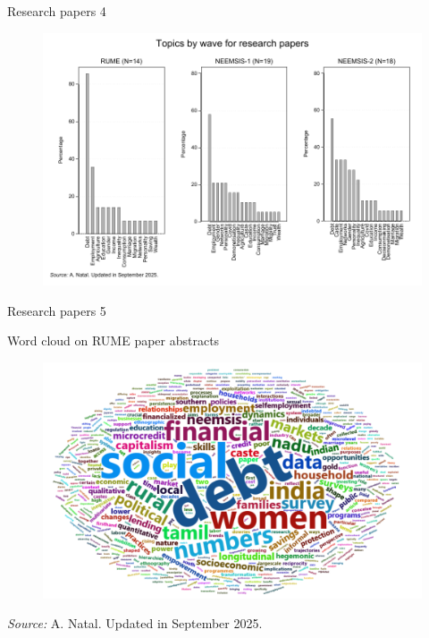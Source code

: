 \documentclass[aspectratio=169]{beamer}
\begin{document}
\begin{frame}{Research papers 4}

\begin{figure}[h]
\centering
\includegraphics[width=0.7\columnwidth]{INPUT/RP_topicswave}
\end{figure}

\end{frame}




\begin{frame}{Research papers 5}
\begin{footnotesize}

Word cloud on RUME paper abstracts
\begin{figure}[h]
\centering
\includegraphics[width=0.6\columnwidth]{INPUT/rume.png}
\end{figure}
\textit{Source:} A. Natal. Updated in September 2025.

\end{footnotesize}
\end{frame}
\end{document}
